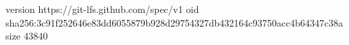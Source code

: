 version https://git-lfs.github.com/spec/v1
oid sha256:3c91f252646e83dd6055879b928d29754327db432164c93750acc4b64347c38a
size 43840
